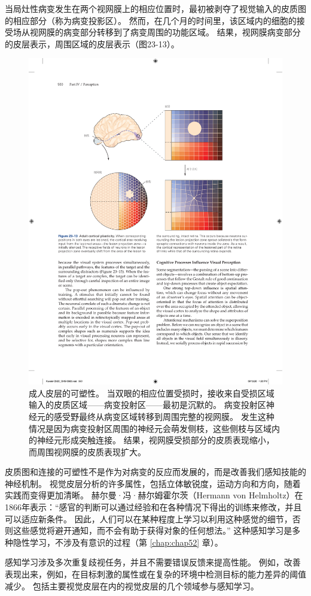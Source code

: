当局灶性病变发生在两个视网膜上的相应位置时，最初被剥夺了视觉输入的皮质图的相应部分（称为病变投影区）。
然而，在几个月的时间里，该区域内的细胞的接受场从视网膜的病变部分转移到了病变周围的功能区域。
结果，视网膜病变部分的皮层表示，周围区域的皮层表示（图23-13）。

\begin{figure}[htbp]
	\centering
	\includegraphics[width=0.7\linewidth]{chap23/fig_23_13}
	\caption{成人皮层的可塑性。
		当双眼的相应位置受损时，接收来自受损区域输入的皮质区域——病变投射区——最初是沉默的。
		病变投射区神经元的感受野最终从病变区域转移到周围完整的视网膜。
		发生这种情况是因为病变投射区周围的神经元会萌发侧枝，这些侧枝与区域内的神经元形成突触连接。
		结果，视网膜受损部分的皮质表现缩小，而周围视网膜的皮质表现扩大。}
	\label{fig:23_13}
\end{figure}


皮质图和连接的可塑性不是作为对病变的反应而发展的，而是改善我们感知技能的神经机制。
视觉皮层分析的许多属性，包括立体敏锐度，运动方向和方向，随着实践而变得更加清晰。
赫尔曼·冯·赫尔姆霍尔茨（Hermann von Helmholtz）在1866年表示：“感官的判断可以通过经验和在各种情况下得出的训练来修改，并且可以适应新条件。
因此，人们可以在某种程度上学习以利用这种感觉的细节，否则这些感觉将避开通知，而不会有助于获得对象的任何想法。” 
这种感知学习是多种隐性学习，不涉及有意识的过程（第 \ref{chap:chap52} 章）。


感知学习涉及多次重复歧视任务，并且不需要错误反馈来提高性能。
例如，改善表现出来，例如，在目标刺激的属性或在复杂的环境中检测目标的能力差异的阈值减少。
包括主要视觉皮层在内的视觉皮层的几个领域参与感知学习。


